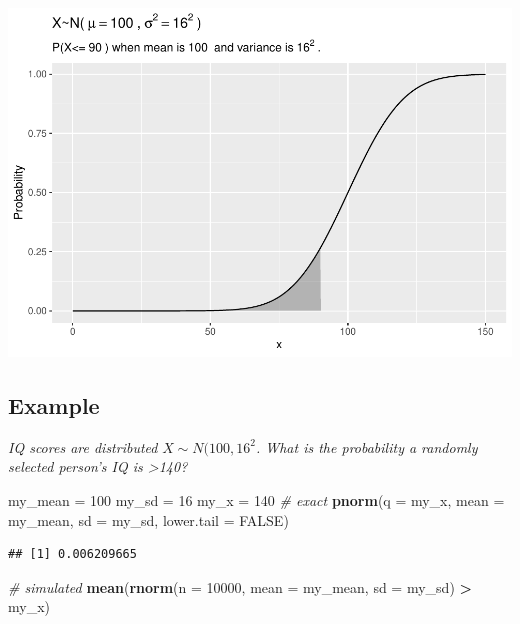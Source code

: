 \documentclass[]{book}
\newenvironment{Shaded}{\begin{snugshade}}{\end{snugshade}}
\newcommand{\CommentTok}[1]{\textcolor[rgb]{0.56,0.35,0.01}{\textit{#1}}}
\newcommand{\DataTypeTok}[1]{\textcolor[rgb]{0.13,0.29,0.53}{#1}}
\newcommand{\DecValTok}[1]{\textcolor[rgb]{0.00,0.00,0.81}{#1}}
\newcommand{\KeywordTok}[1]{\textcolor[rgb]{0.13,0.29,0.53}{\textbf{#1}}}
\newcommand{\NormalTok}[1]{#1}
\newcommand{\OperatorTok}[1]{\textcolor[rgb]{0.81,0.36,0.00}{\textbf{#1}}}
\newcommand{\OtherTok}[1]{\textcolor[rgb]{0.56,0.35,0.01}{#1}}
\newcommand{\StringTok}[1]{\textcolor[rgb]{0.31,0.60,0.02}{#1}}
\begin{document}
\includegraphics{data-sci_files/figure-latex/unnamed-chunk-13-1.pdf}

\hypertarget{example-1}{%
\subsection{Example}\label{example-1}}

\emph{IQ scores are distributed }\(X \sim N(100, 16^2\)\emph{. What is the probability a randomly selected person's IQ is \textgreater140?}

\begin{Shaded}
\begin{Highlighting}[]
\NormalTok{my_mean =}\StringTok{ }\DecValTok{100}
\NormalTok{my_sd =}\StringTok{ }\DecValTok{16}
\NormalTok{my_x =}\StringTok{ }\DecValTok{140}
\CommentTok{# exact}
\KeywordTok{pnorm}\NormalTok{(}\DataTypeTok{q =}\NormalTok{ my_x, }\DataTypeTok{mean =}\NormalTok{ my_mean, }\DataTypeTok{sd =}\NormalTok{ my_sd, }\DataTypeTok{lower.tail =} \OtherTok{FALSE}\NormalTok{)}
\end{Highlighting}
\end{Shaded}

\begin{verbatim}
## [1] 0.006209665
\end{verbatim}

\begin{Shaded}
\begin{Highlighting}[]
\CommentTok{# simulated}
\KeywordTok{mean}\NormalTok{(}\KeywordTok{rnorm}\NormalTok{(}\DataTypeTok{n =} \DecValTok{10000}\NormalTok{, }\DataTypeTok{mean =}\NormalTok{ my_mean, }\DataTypeTok{sd =}\NormalTok{ my_sd) }\OperatorTok{>}\StringTok{ }\NormalTok{my_x)}
\end{Highlighting}
\end{Shaded}
\end{document}

